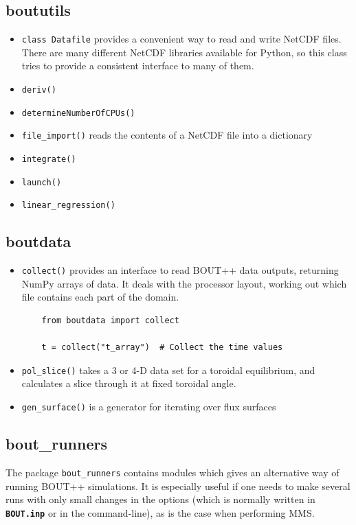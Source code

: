 \documentclass[12pt]{article}
\newcommand{\file}[1]{\texttt{\bf #1}}
\begin{document}
\subsection{boututils}
%
\begin{itemize}
\item
%
\lstinline!class Datafile!
%
 provides a convenient way to read and write NetCDF files. There are many different
  NetCDF libraries available for Python, so this class tries to provide a consistent interface to many of them.
\item
%
\lstinline!deriv()!
%
\item
%
\lstinline!determineNumberOfCPUs()!
%
\item
%
\lstinline!file_import()!
%
 reads the contents of a NetCDF file into a dictionary
\item
%
\lstinline!integrate()!
%
\item
%
\lstinline!launch()!
%
\item
%
\lstinline!linear_regression()!
%
\end{itemize}
%



\subsection{boutdata}
%
\begin{itemize}
\item
%
\lstinline!collect()!
%
 provides an interface to read BOUT++ data outputs, returning NumPy arrays of data.
  It deals with the processor layout, working out which file contains each part of the domain.
  \begin{lstlisting}
    from boutdata import collect

    t = collect("t_array")  # Collect the time values
  \end{lstlisting}
%
\item
%
\lstinline!pol_slice()!
%
 takes a 3 or 4-D data set for a toroidal equilibrium, and calculates a slice
  through it at fixed toroidal angle.
\item
%
\lstinline!gen_surface()!
%
 is a generator for iterating over flux surfaces
\end{itemize}
%



\subsection{bout\_runners}
%
\label{sec:bout_runners}
%
The package
%
\lstinline!bout_runners!
%
 contains modules which gives an
alternative way of running BOUT++ simulations. It is especially useful if one
needs to make several runs with only small changes in the options (which is
normally written in \file{BOUT.inp} or in the command-line), as is the
case when performing MMS.
\end{document}
